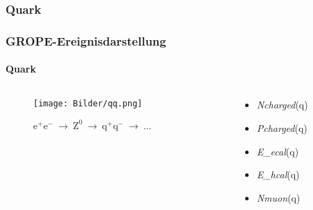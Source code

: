 \documentclass{beamer}
\begin{document}
\subsubsection{Quark}
\begin{frame}
	\frametitle{GROPE-Ereignisdarstellung}
	\framesubtitle{Quark}
	
	\begin{columns}
		\begin{column}{0.6\textwidth}
		\begin{figure}[H]
			\centering
			\label{fig:GROPEqq}
			\texttt{[image: Bilder/qq.png]}
			\caption{{\footnotesize $\mathrm{e}^+\mathrm{e}^- \ \longrightarrow\ \mathrm{Z}^0 \ \longrightarrow\ \mathrm{q}^+\mathrm{q}^-\ \longrightarrow\ ...$}}
		\end{figure}
		\end{column}
		\begin{column}{0.4\textwidth}
		
		\begin{itemize}
			\item {\color{blue}\textit{Ncharged}(q)}\newline
					\only<2>{$\geq 10$}
			\item {\color{blue}\textit{Pcharged}(q)}\newline
			
			\item {\color[rgb]{0.6,0.6,0}\textit{E\_ecal}(q)}\newline

			\item {\color[rgb]{1,0,1}\textit{E\_hcal}(q)}\newline
			
			\item {\color{red}\textit{Nmuon}(q)}\newline
			
		\end{itemize}
		\end{column}
	\end{columns}
	
\end{frame}

\end{document}
